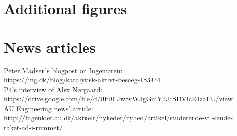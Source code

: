 \appendix
\chapter{Additional figures} \label{App:A}
\lipsum[1]


\chapter{News articles}\label{App:B}
Peter Madsen's blogpost on Ingeniøren:\\ \url{https://ing.dk/blog/katalytisk-aktivt-besoeg-183974}\\
P4's interview of Alex Nørgaard:\\ \url{https://drive.google.com/file/d/0B0FJw8vW3gGmY2J5SDVlcE4zaFU/view}\\
AU Engineering news' article:\\ \url{http://ingenioer.au.dk/aktuelt/nyheder/nyhed/artikel/studerende-vil-sende-raket-ud-i-rummet/}
